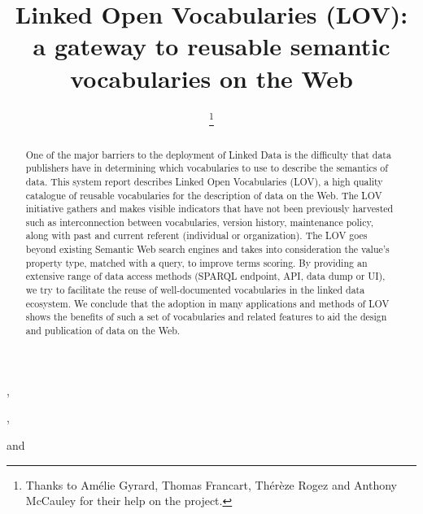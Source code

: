 \documentclass{iosart2c}
\begin{document}
\begin{frontmatter}                        %

%
\title{Linked Open Vocabularies (LOV): a gateway to reusable semantic vocabularies on the Web}




\author[A]{ \thanks{Thanks to Am\'elie Gyrard, Thomas Francart, Th\'er\`{e}ze Rogez and Anthony McCauley for their help on the project.}},
\author[B]{ },
\author[C]{ }
and
\author[D]{ }
\address[A]{Fujitsu (Ireland) Limited, Swords, Co. Dublin, Ireland\\
E-mail: pierre-yves.vandenbussche@ie.fujitsu.com}
\address[B]{Multimedia Communication Department, EURECOM, Campus SophiaTech
450, route des Chappes, 06410 Biot, France\\
E-mail: auguste.atemezing@eurecom.fr}
\address[C]{Ontology Engineering Group (OEG), 
Universidad Polit\'ecnica de Madrid, Madrid, Spain\\
E-mail: mpoveda@fi.upm.es}
\address[D]{Mondeca, 35 boulevard de Strasbourg, 75010 Paris, France
\\
E-mail: bernard.vatant@mondeca.com}


\begin{abstract}
One of the major barriers to the deployment of Linked Data is the difficulty that data publishers have in determining which vocabularies to use to describe the semantics of data. This system report describes Linked Open Vocabularies (LOV), a high quality catalogue of reusable vocabularies for the description of data on the Web. The LOV initiative gathers and makes visible indicators that have not been previously harvested such as interconnection between vocabularies, version history, maintenance policy, along with past and current referent (individual or organization). The LOV goes beyond existing Semantic Web search engines and takes into consideration the value's property type, matched with a query, to improve terms scoring. By providing an extensive range of data access methods (SPARQL endpoint, API, data dump or UI), we try to facilitate the reuse of well-documented vocabularies in the linked data ecosystem. We conclude that the adoption in many applications and methods of LOV shows the benefits of such a set of vocabularies and related features to aid the design and publication of data on the Web.
\end{abstract}


\end{frontmatter}
\end{document}
